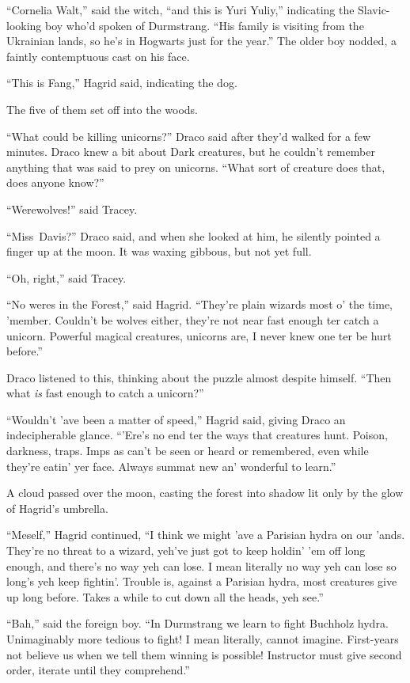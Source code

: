 “Cornelia Walt,” said the witch, “and this is Yuri Yuliy,” indicating the Slavic-looking boy who’d spoken of Durmstrang. “His family is visiting from the Ukrainian lands, so he’s in Hogwarts just for the year.” The older boy nodded, a faintly contemptuous cast on his face.

“This is Fang,” Hagrid said, indicating the dog.

The five of them set off into the woods.

“What could be killing unicorns?” Draco said after they’d walked for a few minutes. Draco knew a bit about Dark creatures, but he couldn’t remember anything that was said to prey on unicorns. “What sort of creature does that, does anyone know?”

“Werewolves!” said Tracey.

“Miss~Davis?” Draco said, and when she looked at him, he silently pointed a finger up at the moon. It was waxing gibbous, but not yet full.

“Oh, right,” said Tracey.

“No weres in the Forest,” said Hagrid. “They’re plain wizards most o’ the time, ’member. Couldn’t be wolves either, they’re not near fast enough ter catch a unicorn. Powerful magical creatures, unicorns are, I never knew one ter be hurt before.”

Draco listened to this, thinking about the puzzle almost despite himself. “Then what \emph{is} fast enough to catch a unicorn?”

“Wouldn’t ’ave been a matter of speed,” Hagrid said, giving Draco an indecipherable glance. “’Ere’s no end ter the ways that creatures hunt. Poison, darkness, traps. Imps as can’t be seen or heard or remembered, even while they’re eatin’ yer face. Always summat new an’ wonderful to learn.”

A cloud passed over the moon, casting the forest into shadow lit only by the glow of Hagrid’s umbrella.

“Meself,” Hagrid continued, “I think we might ’ave a Parisian hydra on our ’ands. They’re no threat to a wizard, yeh’ve just got to keep holdin’ ’em off long enough, and there’s no way yeh can lose. I mean literally no way yeh can lose so long’s yeh keep fightin’. Trouble is, against a Parisian hydra, most creatures give up long before. Takes a while to cut down all the heads, yeh see.”

“Bah,” said the foreign boy. “In Durmstrang we learn to fight Buchholz hydra. Unimaginably more tedious to fight! I mean literally, cannot imagine. First-years not believe us when we tell them winning is possible! Instructor must give second order, iterate until they comprehend.”

